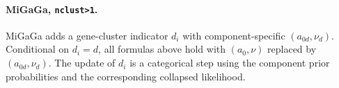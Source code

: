 \documentclass[11pt]{article}
\begin{document}
\paragraph{MiGaGa, \texttt{nclust>1}.}
MiGaGa adds a gene-cluster indicator \(d_i\) with component-specific
\((a_{0d},\nu_d)\).  Conditional on \(d_i=d\), all formulas above hold with
\((a_0,\nu)\) replaced by \((a_{0d},\nu_d)\).  The update of \(d_i\) is a
categorical step using the component prior probabilities and the corresponding
collapsed likelihood.
\end{document}
